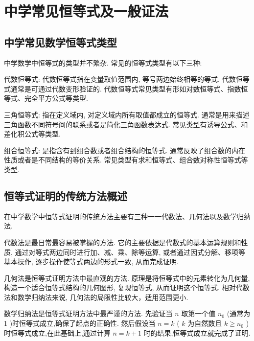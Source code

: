 
\chapter{中学常见恒等式及一般证法}
\section{中学常见数学恒等式类型}
中学数学中恒等式的类型并不繁杂. 常见的恒等式类型有以下三种:

代数恒等式: 代数恒等式指在变量取值范围内, 等号两边始终相等的等式. 代数恒等式通常是可通过代数变形验证的. 代数恒等式常见类型有形如对数恒等式、指数恒等式、完全平方公式等类型. 

三角恒等式: 指在定义域内, 对定义域内所有取值都成立的恒等式. 通常是用来描述三角函数不同符号间的联系或者是简化三角函数表达式. 常见类型有诱导公式、和差化积公式等类型. 


组合恒等式: 是指含有到组合数或者组合结构的恒等式. 通常反映了组合数的内在性质或者是不同结构的等价关系. 常见类型有求和恒等式、组合数对称性恒等式等类型. 


\section{恒等式证明的传统方法概述}
在中学数学中恒等式证明的传统方法主要有三种一一代数法、几何法以及数学归纳法. 

代数法是最日常最容易被掌握的方法. 它的主要依据是代数式的基本运算规则和性质, 通过对等式两边同时进行加、减、乘、除等运算, 或者通过因式分解、移项等基本操作, 逐步操作使等式两边的形式一致, 从而完成证明. 

几何法是恒等式证明方法中最直观的方法. 原理是将恒等式中的元素转化为几何量, 构造一个适合恒等式结构的几何图形, 复现恒等式, 从而证明这个恒等式. 相对代数法和数学归纳法来说, 几何法的局限性比较大，适用范围更小. 


数学归纳法是恒等式证明方法中最严谨的方法. 先验证当 \(n\) 取第一个值 \({n}_{0}\) (通常为 1 )时恒等式成立,确保了起点的正确性. 然后假设当 \(n = k\) ( \(k\) 为自然数且 \(k \geq  {n}_{0}\) )时恒等式成立,在此基础上,通过计算 \(n = k + 1\) 时的结果,恒等式成立就完成了证明. 

